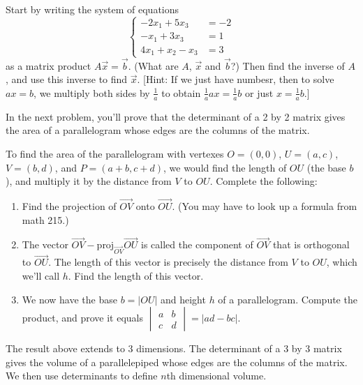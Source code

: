 \begin{problem}
 Start by writing the system of equations 
$$\left\{
\begin{array}{rl}
 -2x_1+ 5x_3 &=-2\\
 -x_1+ 3x_3 &=1\\
 4x_1 +x_2  -x_3 &=3
\end{array}
\right.$$ as a matrix product $A\vec x =\vec b$.  (What are $A$, $\vec x$ and $\vec b$?)  
Then find the inverse of $A$, and use this inverse to find $\vec x$. [Hint:  If we just have numbesr, then to solve $ax=b$, we multiply both sides by $\frac{1}{a}$ to obtain $\frac{1}{a}ax=\frac{1}{a}b$ or just $x=\frac{1}{a}b$.]
\end{problem}

In the next problem, you'll prove that the determinant of a 2 by 2 matrix gives the area of a parallelogram whose edges are the columns of the matrix.
\begin{problem}
 To find the area of the parallelogram with vertexes $O=(0,0)$, $U=(a,c)$, $V=(b,d)$, and $P=(a+b,c+d)$, we would find the length of $OU$ (the base $b$), and multiply it by the distance from $V$ to $OU$. Complete the following:
\begin{enumerate}
 \item Find the projection of $\vec {OV}$ onto $\vec {OU}$. (You may have to look up a formula from math 215.)
 \item The vector $\vec {OV}-\text{proj}_{\vec{OV}}\vec{OU}$ is called the component of $\vec {OV}$ that is orthogonal to $\vec {OU}$. The length of this vector is precisely the distance from $V$ to $OU$, which we'll call $h$. Find the length of this vector.
 \item We now have the base $b=|OU|$ and height $h$ of a parallelogram.  Compute the product, and prove it equals $\begin{vmatrix}a&b\\c&d\end{vmatrix}=|ad-bc|$.
\end{enumerate}
\end{problem}

The result above extends to 3 dimensions.  The determinant of a 3 by 3 matrix gives the volume of a parallelepiped whose edges are the columns of the matrix.  We then use determinants to define $n$th dimensional volume.  

